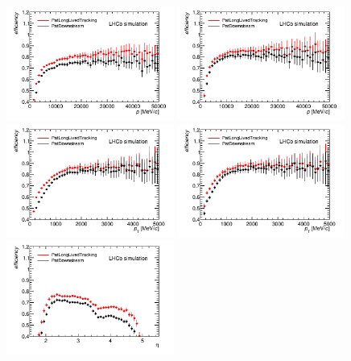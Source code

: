 \begin{figure}[tbph]
\begin{center}
\includegraphics[width = 0.49\textwidth]{figures/EffPatLLT/compare/BJpsiKSP_TBTC.png} 
\includegraphics[width = 0.49\textwidth]{figures/EffPatLLT/compare/BJpsiKSFromBDP_TBTC.png}
\includegraphics[width = 0.49\textwidth]{figures/EffPatLLT/compare/BJpsiKSPt_TBTC.png} 
\includegraphics[width = 0.49\textwidth]{figures/EffPatLLT/compare/BJpsiKSFromBDPt_TBTC.png}
\includegraphics[width = 0.49\textwidth]{figures/EffPatLLT/compare/BJpsiKSEta_TBTC.png} 

\end{center}
\end{figure}
